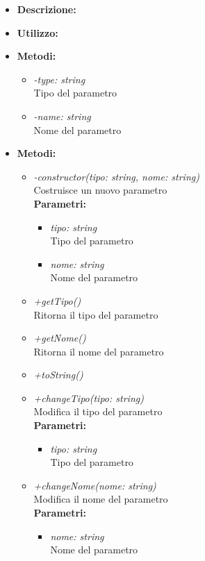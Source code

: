 \begin{itemize}
	\item \textbf{Descrizione:}\\
	
	\item \textbf{Utilizzo:}\\
	
	\item \textbf{Metodi:}
		\begin{itemize}
			\item \emph{-type: string}\\
    		Tipo del parametro
    		\item \emph{-name: string}\\
    		Nome del parametro
		\end{itemize}
	\item \textbf{Metodi:}
		\begin{itemize}
			\item \emph{-constructor(tipo: string, nome: string)}\\
    		Costruisce un nuovo parametro\\
    		\textbf{Parametri:}
    		\begin{itemize}
    			\item \emph{tipo: string}\\
    			Tipo del parametro
    			\item \emph{nome: string}\\
    			Nome del parametro
    		\end{itemize}
    		\item \emph{+getTipo()}\\
    		Ritorna il tipo del parametro
    		\item \emph{+getNome()}\\
    		Ritorna il nome del parametro
    		\item \emph{+toString()}\\
    		
    		\item \emph{+changeTipo(tipo: string)}\\
    		Modifica il tipo del parametro\\
    		\textbf{Parametri:}
    		\begin{itemize}
    			\item \emph{tipo: string}\\
    			Tipo del parametro
    		\end{itemize}
    		\item \emph{+changeNome(nome: string)}\\
    		Modifica il nome del parametro\\
    		\textbf{Parametri:}
    		\begin{itemize}
    			\item \emph{nome: string}\\
    			Nome del parametro
    		\end{itemize}
    	\end{itemize}
\end{itemize}